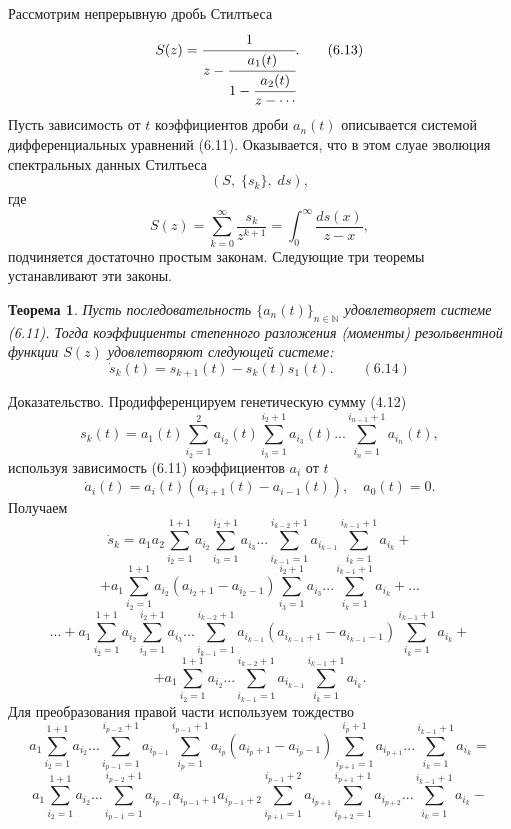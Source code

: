 \documentclass[12 pt, a4 paper]{article}
\theoremstyle{plain}   \newtheorem{Pro}{Задача}
\newtheorem{The}{Теорема}
\begin{document}
Рассмотрим непрерывную дробь Стилтьеса
\begin{equation*}
  S(z)=
    \cfrac{1}{z-
	  \cfrac{a_1 (t)}{1-
	    \cfrac{a_2 (t)}{z-\dotsb
	}}}.
	  \qquad (6.13)
\end{equation*}
Пусть зависимость от
$ t $
коэффициентов дроби
$ a_n (t) $
описывается системой дифференциальных уравнений (6.11).
Оказывается, что в этом слуае эволюция спектральных
данных Стилтьеса
$$
  ( S, \; \{ s_k \} , \; ds ) ,
$$
где
$$
  S(z)=\sum _{k=0}^{\infty}
    \frac{s_k}{z^{k+1}}=
	  \int _0 ^{\infty}
	    \frac{ds(x)}{z-x},
$$
подчиняется достаточно простым законам.
Следующие три теоремы устанавливают эти законы.
\begin{The}
Пусть последовательность
$ \{ a_n (t) \} _{n \in \mathbb{N}} $
удовлетворяет системе (6.11). Тогда коэффициенты степенного
разложения (моменты) резольвентной функции
$ S(z) $
удовлетворяют следующей системе:
$$
  \dot s_k (t)=s_{k+1}(t)-s_k (t)s_1 (t) .
    \qquad (6.14)
$$
\end{The}
{\Large Доказательство.}
Продифференцируем генетическую сумму (4.12)
$$
  s_k (t)=a_1 (t) \sum _{i_2 =1}^2 a_{i_2}(t)
    \sum _{i_3 =1}^{i_2 +1}a_{i_3}(t) ...
	  \sum _{i_n =1}^{i_{n-1}+1}a_{i_n}(t),
$$
используя зависимость (6.11) коэффициентов
$ a_i $
от
$ t $
$$
  \dot a_i (t)=a_i (t)(a_{i+1}(t)-a_{i-1}(t)),
    \quad a_0 (t)=0.
$$
Получаем
$$
  \dot s_k =a_1 a_2
    \sum _{i_2 =1}^{1+1}a_{i_2}
	  \sum _{i_3 =1}^{i_2 +1}a_{i_3}...
	    \sum _{i_{k-1}=1}^{i_{k-2}+1}a_{i_{k-1}}
		  \sum _{i_k =1}^{i_{k-1}+1}a_{i_k}+
$$
$$
  +a_1 \sum _{i_2 =1}^{1+1}a_{i_2}(a_{i_2 +1}-a_{i_2 -1})
    \sum _{i_3 =1}^{i_2 +1}a_{i_3}...
	  \sum _{i_k =1}^{i_{k-1}+1}a_{i_k}+...
$$
$$
  ...+a_1 \sum _{i_2 =1}^{1+1}a_{i_2}
    \sum _{i_3 =1}^{i_2 +1}a_{i_3}...
	  \sum _{i_{k-1}=1}^{i_{k-2}+1}a_{i_{k-1}}
	    (a_{i_{k-1}+1}-a_{i_{k-1}-1})
		  \sum _{i_k =1}^{i_{k-1}+1}a_{i_k}+
$$
$$
  +a_1 \sum _{i_2 =1}^{1+1}a_{i_2}...
    \sum _{i_{k-1}=1}^{i_{k-2}+1}a_{i_{k-1}}
	  \sum _{i_k =1}^{i_{k-1}+1}a_{i_k}.
$$
Для преобразования правой части используем тождество
$$
  a_1 \sum _{i_2 =1}^{1+1}a_{i_2}...
    \sum _{i_{p-1}=1}^{i_{p-2}+1}a_{i_{p-1}}
	  \sum _{i_p =1}^{i_{p-1}+1}a_{i_p}(a_{i_p +1}-a_{i_p -1})
	    \sum _{i_{p+1}=1}^{i_p +1}a_{i_{p+1}}...
		  \sum _{i_k =1}^{i_{k-1}+1}a_{i_k}=
$$
$$
  a_1 \sum _{i_2 =1}^{1+1}a_{i_2}...
    \sum _{i_{p-1}=1}^{i_{p-2}+1}a_{i_{p-1}}a_{i_{p-1}+1}a_{i_{p-1}+2}
	  \sum _{i_{p+1}=1}^{i_{p-1}+2}a_{i_{p+1}}
	    \sum _{i_{p+2}=1}^{i_{p+1}+1}a_{i_{p+2}}...
		  \sum _{i_k =1}^{i_{k-1}+1}a_{i_k}-
$$
\end{document}
